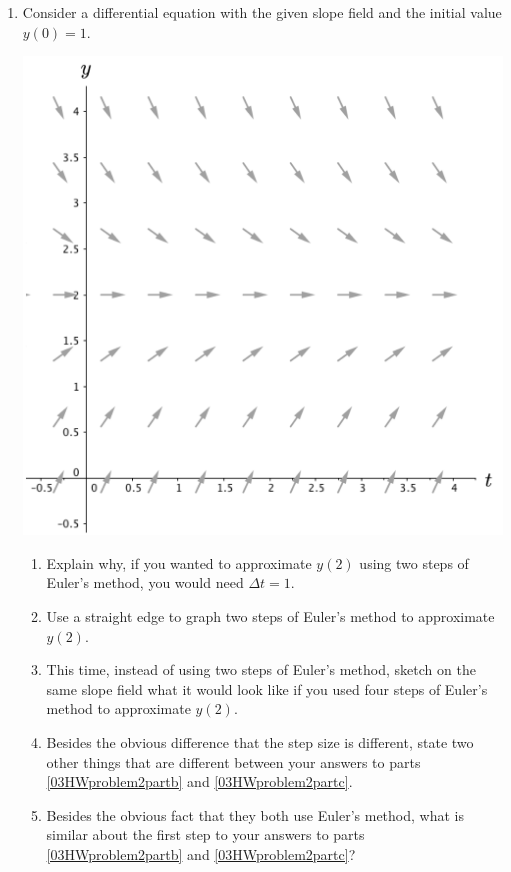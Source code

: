 \begin{enumerate}

\clearpage

\item Consider a differential equation with the given slope field and the initial value $y(0)=1$. \label{03HWproblem2}
\begin{center}
\includegraphics[width=5in]{03/03HWSlopeField2.png}
\end{center}
\begin{enumerate}
\item Explain why, if you wanted to approximate $y(2)$ using two steps of Euler's method, you would need $\Delta t = 1$.  \label{03HWproblem2parta}
\item Use a straight edge to graph two steps of Euler's method to approximate $y(2)$. \label{03HWproblem2partb}
\item This time, instead of using two steps of Euler's method, sketch on the same slope field what it would look like if you used four steps of Euler's method to approximate $y(2)$. \label{03HWproblem2partc}
\item Besides the obvious difference that the step size is different, state two other things that are different between your answers to parts \ref{03HWproblem2partb} and \ref{03HWproblem2partc}. \label{03HWproblem2partd}
\item Besides the obvious fact that they both use Euler's method, what is similar about the first step to your answers to parts \ref{03HWproblem2partb} and \ref{03HWproblem2partc}? \label{03HWproblem2parte}


\end{enumerate}
\end{enumerate}
